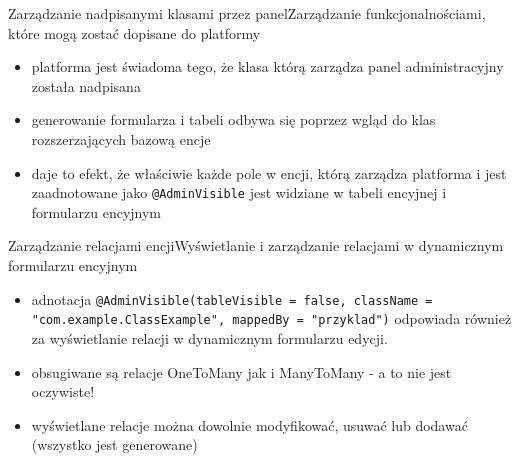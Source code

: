 \documentclass[polish,xcolor=table,9pt,aspectratio=1610,hyperref={pdfpagemode=FullScreen}]{beamer}
\begin{document}
\begin{frame}{Zarządzanie nadpisanymi klasami przez panel}{Zarządzanie funkcjonalnościami, które mogą zostać dopisane do platformy}
	\begin{itemize}
		\begin{exampleblock}{Przykład}
			Programista decyduje się na zaimplementowanie nowej funkcjonalności, która będzie polegała na tym, że każde zamówienie będzie mógło mieć uwagę. W systemie istnieje encja Order, ma już zdefiniowane pola, ma również swój formularz. Nie jest to jednak problem, gdyż w tym przypadku wystarczy zaimplementować klasę \texttt{MyOrder extends Order}, która będzie zawierała pole \texttt{private String note}.  Aplikacja korzystająca z frameworkowego panelu będzie świadoma tego, że encja order została nadpisana i będzie szukać w niej pól z aadnotacją \texttt{@AdminVisible}, które zostaną wyświetlone w dynamicznym formularzu i dynamicznej tabelce.
		\end{exampleblock}
		\item<1-> platforma jest świadoma tego, że klasa którą zarządza panel administracyjny została nadpisana 
		\item<2-> generowanie formularza i tabeli odbywa się poprzez wgląd do klas rozszerzających bazową encje
		\item<3-> daje to efekt, że właściwie każde pole w encji, którą zarządza platforma i jest zaadnotowane jako \texttt{@AdminVisible} jest widziane w tabeli encyjnej i formularzu encyjnym
	\end{itemize}
\end{frame}

\begin{frame}{Zarządzanie relacjami encji}{Wyświetlanie i zarządzanie relacjami w dynamicznym formularzu encyjnym}
\begin{itemize}
	\begin{exampleblock}{Przykład}
		Encja \texttt{Product} jest w relacji \texttt{OneToMany} z encją \texttt{Price}. Aby panel administracyjny był w pełni wartościowy, po wejściu do formularza edycyjnego powinniśmy mieć możliwość dodania ceny do produktu. W tym celu należy umieścić adnotację \texttt{@AdminVisible(tableVisible = false, className = "com.example.Price", mappedBy = "product")} nad kolekcją cen. System w panelu administracyjnym wyświetli listę cen w produkcie. 
	\end{exampleblock}
	\item<1-> adnotacja \texttt{@AdminVisible(tableVisible = false, className = "com.example.ClassExample", mappedBy = "przyklad")} odpowiada również za wyświetlanie relacji w dynamicznym formularzu edycji. 
	\item<2-> obsugiwane są relacje OneToMany jak i ManyToMany - a to nie jest oczywiste!
	\item<3-> wyświetlane relacje można dowolnie modyfikować, usuwać lub dodawać (wszystko jest generowane)
\end{itemize}
\end{frame}
\end{document}
